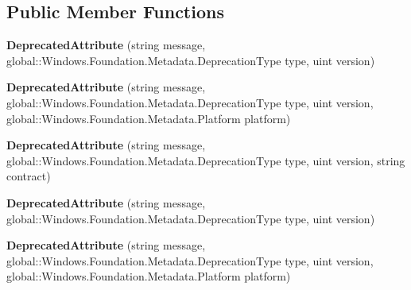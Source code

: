 \subsection*{Public Member Functions}
\begin{DoxyCompactItemize}
\item 
\mbox{\label{class_windows_1_1_foundation_1_1_metadata_1_1_deprecated_attribute_a6ab4cdc714aeb94c30e9c44038807120}} 
{\bfseries Deprecated\+Attribute} (string message, global\+::\+Windows.\+Foundation.\+Metadata.\+Deprecation\+Type type, uint version)
\item 
\mbox{\label{class_windows_1_1_foundation_1_1_metadata_1_1_deprecated_attribute_a17e8fceeae3254fa89cd64e410f2ca4e}} 
{\bfseries Deprecated\+Attribute} (string message, global\+::\+Windows.\+Foundation.\+Metadata.\+Deprecation\+Type type, uint version, global\+::\+Windows.\+Foundation.\+Metadata.\+Platform platform)
\item 
\mbox{\label{class_windows_1_1_foundation_1_1_metadata_1_1_deprecated_attribute_aa776754af460f6e292c26901285ed49a}} 
{\bfseries Deprecated\+Attribute} (string message, global\+::\+Windows.\+Foundation.\+Metadata.\+Deprecation\+Type type, uint version, string contract)
\item 
\mbox{\label{class_windows_1_1_foundation_1_1_metadata_1_1_deprecated_attribute_a6ab4cdc714aeb94c30e9c44038807120}} 
{\bfseries Deprecated\+Attribute} (string message, global\+::\+Windows.\+Foundation.\+Metadata.\+Deprecation\+Type type, uint version)
\item 
\mbox{\label{class_windows_1_1_foundation_1_1_metadata_1_1_deprecated_attribute_a17e8fceeae3254fa89cd64e410f2ca4e}} 
{\bfseries Deprecated\+Attribute} (string message, global\+::\+Windows.\+Foundation.\+Metadata.\+Deprecation\+Type type, uint version, global\+::\+Windows.\+Foundation.\+Metadata.\+Platform platform)
\item 
\mbox{\label{class_windows_1_1_foundation_1_1_metadata_1_1_deprecated_attribute_aa776754af460f6e292c26901285ed49a}} 

\end{DoxyCompactItemize}
